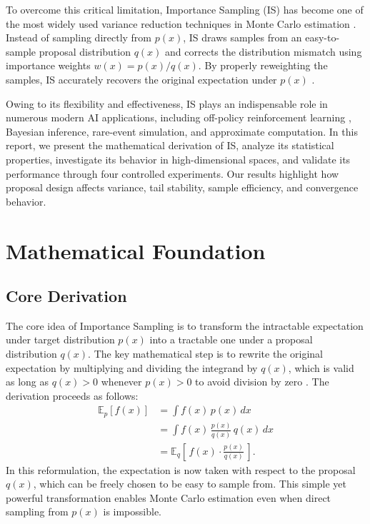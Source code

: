 \documentclass[conference,compsoc]{IEEEtran}
\begin{document}
To overcome this critical limitation, Importance Sampling (IS) has become one of the most widely used variance reduction techniques in Monte Carlo estimation \cite{mcbook}. Instead of sampling directly from \(p(x)\), IS draws samples from an easy-to-sample proposal distribution \(q(x)\) and corrects the distribution mismatch using importance weights \(w(x) = p(x)/q(x)\). By properly reweighting the samples, IS accurately recovers the original expectation under \(p(x)\) \cite{robert2004monte}.

Owing to its flexibility and effectiveness, IS plays an indispensable role in numerous modern AI applications, including off-policy reinforcement learning \cite{sugiyama2015statistical}, Bayesian inference, rare-event simulation, and approximate computation. In this report, we present the mathematical derivation of IS, analyze its statistical properties, investigate its behavior in high-dimensional spaces, and validate its performance through four controlled experiments. Our results highlight how proposal design affects variance, tail stability, sample efficiency, and convergence behavior.

\section{Mathematical Foundation}
\subsection{Core Derivation}
The core idea of Importance Sampling is to transform the intractable expectation under target distribution \(p(x)\) into a tractable one under a proposal distribution \(q(x)\). The key mathematical step is to rewrite the original expectation by multiplying and dividing the integrand by \(q(x)\), which is valid as long as \(q(x) > 0\) whenever \(p(x) > 0\) to avoid division by zero \cite{robert2004monte,mcbook}. The derivation proceeds as follows:
\begin{align*}
\mathbb{E}_{p}[f(x)] 
&= \int f(x)\,p(x)\,dx \\
&= \int f(x)\,\frac{p(x)}{q(x)}\,q(x)\,dx \\
&= \mathbb{E}_{q}\left[\,f(x)\cdot \frac{p(x)}{q(x)}\,\right].
\end{align*}
In this reformulation, the expectation is now taken with respect to the proposal \(q(x)\), which can be freely chosen to be easy to sample from. This simple yet powerful transformation enables Monte Carlo estimation even when direct sampling from \(p(x)\) is impossible.
\end{document}
